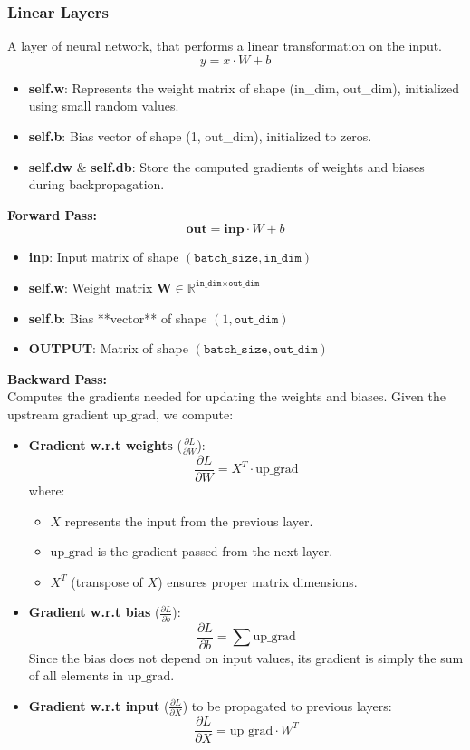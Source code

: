 \documentclass{article}
\begin{document}
\subsubsection*{Linear Layers}
A layer of neural network, that performs a linear transformation on the input.
\[
y = x \cdot W + b
\]
\begin{itemize}
  \item \textbf{self.w}: Represents the weight matrix of shape (in\_dim, out\_dim), initialized using small random values.
  \item \textbf{self.b}: Bias vector of shape (1, out\_dim), initialized to zeros.
  \item \textbf{self.dw} \& \textbf{self.db}: Store the computed gradients of weights and biases during backpropagation.
\end{itemize}
\textbf{Forward Pass:}
\[
\textbf{out} = \textbf{inp} \cdot W + b
\]
\begin{itemize}
  \item \textbf{inp}: Input matrix of shape \((\texttt{batch\_size}, \texttt{in\_dim})\)
 \item \textbf{self.w}: Weight matrix \( \mathbf{W} \in \mathbb{R}^{\texttt{in\_dim} \times \texttt{out\_dim}} \)
  \item \textbf{self.b}: Bias **vector** of shape \((1, \texttt{out\_dim})\)  %
  \item \textbf{OUTPUT}: Matrix of shape \((\texttt{batch\_size}, \texttt{out\_dim})\)
\end{itemize}

\textbf{Backward Pass:}
\\ Computes the gradients needed for updating the weights and biases. Given the upstream gradient \(\text{up\_grad}\), we compute:

\begin{itemize}
  \item \textbf{Gradient w.r.t weights} (\(\frac{\partial L}{\partial W}\)):
  \[
  \frac{\partial L}{\partial W} = X^T \cdot \text{up\_grad}
  \]
  where:
  \begin{itemize}
    \item \( X \) represents the input from the previous layer.
    \item \( \text{up\_grad} \) is the gradient passed from the next layer.
    \item \( X^T \) (transpose of \( X \)) ensures proper matrix dimensions.
  \end{itemize}

  \item \textbf{Gradient w.r.t bias} (\(\frac{\partial L}{\partial b}\)):
  \[
  \frac{\partial L}{\partial b} = \sum \text{up\_grad}
  \]
  Since the bias does not depend on input values, its gradient is simply the sum of all elements in \(\text{up\_grad}\).

  \item \textbf{Gradient w.r.t input} (\(\frac{\partial L}{\partial X}\)) to be propagated to previous layers:
  \[
  \frac{\partial L}{\partial X} = \text{up\_grad} \cdot W^T
  \]
\end{itemize}
\end{document}
